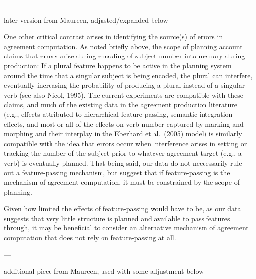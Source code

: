 \documentclass[12pt,titlepage]{article}
\begin{document}
{---

later version from Maureen, adjusted/expanded below

One other critical contrast arises in identifying the source(s) of errors
in agreement computation.  As noted briefly above, the scope of planning
account claims that errors arise during encoding of subject number into
memory during production: If a plural feature happens to be active in the
planning system around the time that a singular subject is being encoded,
the plural can interfere, eventually increasing the probability of
producing a plural instead of a singular verb (see also Nicol, 1995).  The
current experiments are compatible with these claims, and much of the
existing data in the agreement production literature (e.g., effects
attributed to hierarchical feature-passing, semantic integration effects,
and most or all of the effects on verb number captured by marking and
morphing and their interplay in the Eberhard et al.\ (2005) model) is
similarly compatible with the idea that errors occur when interference
arises in setting or tracking the number of the subject prior to whatever
agreement target (e.g., a verb) is eventually planned.  That being said,
our data do not neccessarily rule out a feature-passing mechanism, but
suggest that if feature-passing is the mechanism of agreement computation,
it must be constrained by the scope of planning.


Given how limited the effects of feature-passing would have to be, as our
data suggests that very little structure is planned and available to pass
features through, it may be beneficial to consider an alternative mechanism
of agreement computation that does not rely on feature-passing at all.

---

additional piece from Maureen, used with some adjustment below

}
\end{document}
